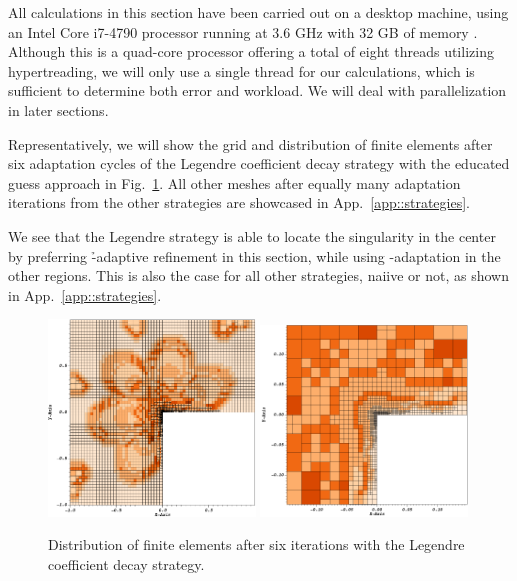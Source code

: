 All calculations in this section have been carried out on a desktop machine, using an Intel  Core i7-4790 processor running at 3.6 GHz with 32 GB of memory . Although this is a quad-core processor offering a total of eight threads utilizing hypertreading, we will only use a single thread for our calculations, which is sufficient to determine both error and workload. We will deal with parallelization in later sections.



Representatively, we will show the grid and distribution of finite elements after six adaptation cycles of the Legendre coefficient decay strategy with the educated guess approach in Fig.~\ref{fig:fedegrees}. All other meshes after equally many adaptation iterations from the other strategies are showcased in App.~\ref{app::strategies}.

We see that the Legendre strategy is able to locate the singularity in the center by preferring \h-adaptive refinement in this section, while using \p-adaptation in the other regions. This is also the case for all other strategies, naiive or not, as shown in App.~\ref{app::strategies}.

\begin{figure}
\centering
\includegraphics[width=0.49\textwidth]{figures/results/corner-2d-error-hp-legendre-05_fedegrees.png}
\includegraphics[width=0.49\textwidth]{figures/results/corner-2d-error-hp-legendre-05_fedegrees_zoom.png}
\caption{Distribution of finite elements after six iterations with the Legendre coefficient decay strategy.}
\label{fig:fedegrees}
\end{figure}

